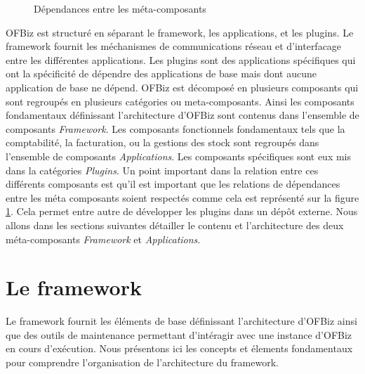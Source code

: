 \documentclass[a4paper, 11pt]{report}
\begin{document}

\begin{figure}
  \centering
  \caption{Dépendances entre les méta-composants}
  \label{fig:compdep}
\end{figure}

OFBiz est structuré en séparant le framework, les applications, et les
plugins.  Le framework fournit les méchanismes de communications
réseau et d'interfacage entre les différentes applications.  Les
plugins sont des applications spécifiques qui ont la spécificité de
dépendre des applications de base mais dont aucune application de base
ne dépend.  OFBiz est décomposé en plusieurs composants qui sont
regroupés en plusieurs catégories ou meta-composants. Ainsi les
composants fondamentaux définissant l'architecture d'OFBiz sont
contenus dans l'ensemble de composants \emph{Framework}.  Les
composants fonctionnels fondamentaux tels que la comptabilité, la
facturation, ou la gestions des stock sont regroupés dans l'ensemble
de composants \emph{Applications}.  Les composants spécifiques sont
eux mis dans la catégories \emph{Plugins}. Un point important dans la
relation entre ces différents composants est qu'il est important que
les relations de dépendances entre les méta composants soient
respectés comme cela est représenté sur la figure \ref{fig:compdep}.
Cela permet entre autre de développer les plugins dans un dépôt
externe.  Nous allons dans les sections suivantes détailler le contenu
et l'architecture des deux méta-composants \emph{Framework} et
\emph{Applications}.

\section{Le framework}

Le framework fournit les éléments de base définissant l'architecture
d'OFBiz ainsi que des outils de maintenance permettant d'intéragir
avec une instance d'OFBiz en cours d'exécution. Nous présentons ici
les concepts et élements fondamentaux pour comprendre l'organisation
de l'architecture du framework.
\end{document}
